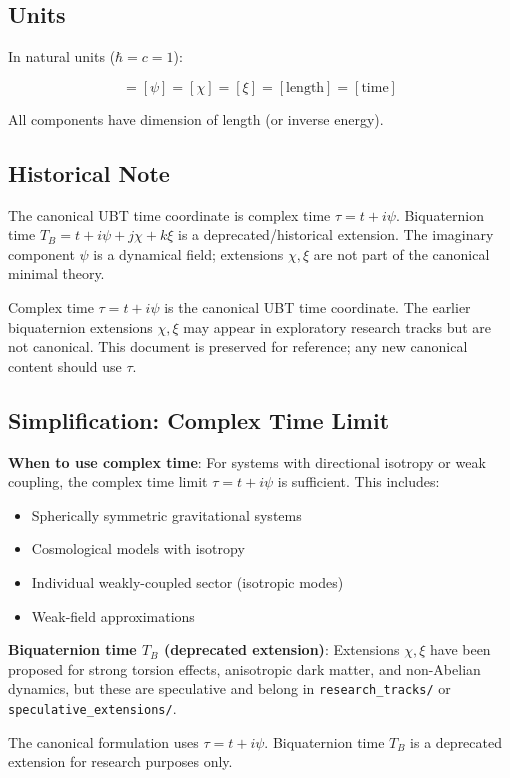 \subsection{Units}

In natural units ($\hbar = c = 1$):

\begin{equation}
[t] = [\psi] = [\chi] = [\xi] = [\text{length}] = [\text{time}]
\end{equation}

All components have dimension of length (or inverse energy).

\subsection{Historical Note}

The canonical UBT time coordinate is complex time $\tau = t + i\psi$. Biquaternion time $T_B = t + i\psi + j\chi + k\xi$ is a deprecated/historical extension. The imaginary component $\psi$ is a dynamical field; extensions $\chi, \xi$ are not part of the canonical minimal theory. 

Complex time $\tau = t + i\psi$ is the canonical UBT time coordinate.
The earlier biquaternion extensions $\chi, \xi$ may appear in exploratory research tracks but are not canonical.
This document is preserved for reference; any new canonical content should use $\tau$.

\subsection{Simplification: Complex Time Limit}

\textbf{When to use complex time}: For systems with directional isotropy or weak coupling, the complex time limit $\tau = t + i\psi$ is sufficient. This includes:

\begin{itemize}
    \item Spherically symmetric gravitational systems
    \item Cosmological models with isotropy
    \item Individual weakly-coupled sector (isotropic modes)
    \item Weak-field approximations
\end{itemize}

\textbf{Biquaternion time $T_B$ (deprecated extension)}: Extensions $\chi, \xi$ have been proposed for
strong torsion effects, anisotropic dark matter, and non-Abelian dynamics, but these are speculative and
belong in \texttt{research\_tracks/} or \texttt{speculative\_extensions/}.

The canonical formulation uses $\tau = t + i\psi$. Biquaternion time $T_B$ is a deprecated extension for research purposes only.

